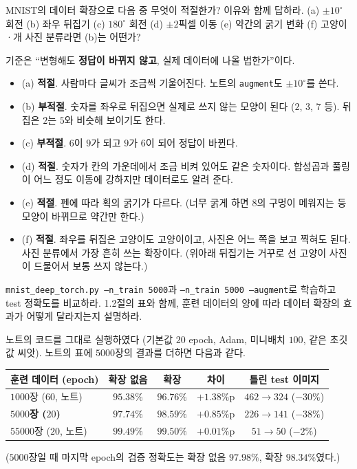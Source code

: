 \documentclass[11pt,a4paper]{article}
\begin{document}
\begin{problems}
\item MNIST의 데이터 확장으로 다음 중 무엇이 적절한가? 이유와 함께 답하라.
(a) $\pm10^\circ$ 회전 (b) 좌우 뒤집기 (c) $180^\circ$ 회전 (d) $\pm2$픽셀 이동 (e) 약간의 굵기 변화
(f) 고양이·개 사진 분류라면 (b)는 어떤가?

\begin{sol}
기준은 ``변형해도 \textbf{정답이 바뀌지 않고}, 실제 데이터에 나올 법한가''이다.
\begin{itemize}[leftmargin=1.5em,itemsep=2pt]
\item (a) \textbf{적절}. 사람마다 글씨가 조금씩 기울어진다. 노트의 \texttt{augment}도 $\pm10^\circ$를 쓴다.
\item (b) \textbf{부적절}. 숫자를 좌우로 뒤집으면 실제로 쓰지 않는 모양이 된다 ($2$, $3$, $7$ 등). 뒤집은 $2$는 $5$와 비슷해 보이기도 한다.
\item (c) \textbf{부적절}. $6$이 $9$가 되고 $9$가 $6$이 되어 정답이 바뀐다.
\item (d) \textbf{적절}. 숫자가 칸의 가운데에서 조금 비켜 있어도 같은 숫자이다. 합성곱과 풀링이 어느 정도 이동에 강하지만 데이터로도 알려 준다.
\item (e) \textbf{적절}. 펜에 따라 획의 굵기가 다르다. (너무 굵게 하면 $8$의 구멍이 메워지는 등 모양이 바뀌므로 약간만 한다.)
\item (f) \textbf{적절}. 좌우를 뒤집은 고양이도 고양이이고, 사진은 어느 쪽을 보고 찍혀도 된다. 사진 분류에서 가장 흔히 쓰는 확장이다.
(위아래 뒤집기는 거꾸로 선 고양이 사진이 드물어서 보통 쓰지 않는다.)
\end{itemize}
\end{sol}

\item \texttt{mnist\_deep\_torch.py --n\_train 5000}과 \texttt{--n\_train 5000 --augment}로 학습하고 test 정확도를 비교하라.
1.2절의 표와 함께, 훈련 데이터의 양에 따라 데이터 확장의 효과가 어떻게 달라지는지 설명하라.

\begin{sol}
노트의 코드를 그대로 실행하였다 (기본값 $20$ epoch, Adam, 미니배치 $100$, 같은 초깃값 씨앗). 노트의 표에 $5000$장의 결과를 더하면 다음과 같다.
\begin{center}
\begin{tabular}{@{}lcccc@{}}
\toprule
훈련 데이터 (epoch) & 확장 없음 & 확장 & 차이 & 틀린 test 이미지 \\
\midrule
$1000$장 ($60$, 노트) & $95.38\%$ & $96.76\%$ & $+1.38\%$p & $462\to324$ ($-30\%$) \\
\textbf{$5000$장 ($20$)} & $\mathbf{97.74\%}$ & $\mathbf{98.59\%}$ & $+0.85\%$p & $226\to141$ ($-38\%$) \\
$55000$장 ($20$, 노트) & $99.49\%$ & $99.50\%$ & $+0.01\%$p & $51\to50$ ($-2\%$) \\
\bottomrule
\end{tabular}
\end{center}
($5000$장일 때 마지막 epoch의 검증 정확도는 확장 없음 $97.98\%$, 확장 $98.34\%$였다.)


\end{sol}
\end{problems}
\end{document}
